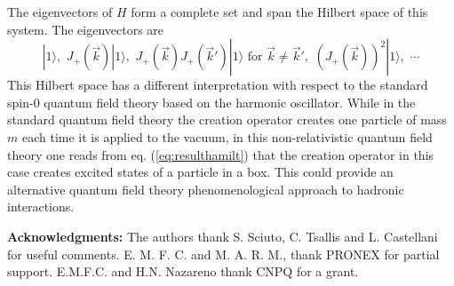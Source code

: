 \documentclass[a4paper,12pt]{article}
\begin{document}
The eigenvectors of $H$ form a complete set and span the Hilbert
space of this system. The eigenvectors are
\begin{equation} 
|1 \rangle, \,\, J_{+}(\vec{k}) |1 \rangle, \,\,
J_{+}(\vec{k}) J_{+}(\vec{k}') |1 \rangle \,\,
\mbox{for} \,\, \vec{k}\not= \vec{k}', \,\,
(J_{+}(\vec{k}))^2 |1 \rangle, \,\, \cdots
\label{eq:hilbert} 
\end{equation}
This Hilbert space has a different interpretation with
respect to the standard spin-$0$ quantum field theory based
on the harmonic oscillator. While in the standard
quantum field theory the creation operator creates one
particle of mass $m$ each time it is applied to the vacuum, 
in this non-relativistic 
quantum field theory one reads from eq. 
(\ref{eq:resulthamilt}) that the creation operator in this
case creates excited states of a particle in a box. This could
provide an alternative quantum field theory phenomenological 
approach to hadronic interactions.



\vspace{0.7 cm}
\noindent
{\bf Acknowledgments:} The authors thank S. Sciuto, C. Tsallis and
L. Castellani for useful comments. E. M. F. C. and 
M. A. R. M., thank PRONEX for partial support. E.M.F.C. and H.N. Nazareno 
thank CNPQ for a grant.




\vspace{0.7 cm} 
\end{document}
